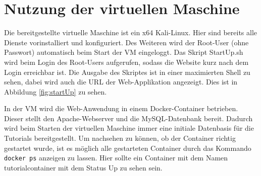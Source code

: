 \section{Nutzung der virtuellen Maschine}

Die bereitgestellte virtuelle Maschine ist ein x64 Kali-Linux. Hier sind bereits alle Dienste vorinstalliert und konfiguriert. Des Weiteren wird der Root-User (ohne Passwort) automatisch beim Start der VM eingeloggt. Das Skript StartUp.sh wird beim Login des Root-Users aufgerufen, sodass die Website kurz nach dem Login erreichbar ist. Die Ausgabe des Skriptes ist in einer maximierten Shell zu sehen, dabei wird auch die URL der Web-Applikation angezeigt. Dies ist in Abbildung \ref{fig:startUp} zu sehen.\medskip

In der VM wird die Web-Anwendung in einem Docker-Container betrieben. Dieser stellt den Apache-Webserver und die MySQL-Datenbank bereit. Dadurch wird beim Starten der virtuellen Maschine immer eine initiale Datenbasis für die Tutorials bereitgestellt. Um nachsehen zu können, ob der Container richtig gestartet wurde, ist es möglich alle gestarteten Container durch das Kommando \colorbox{altgray}{\lstinline|docker ps|} anzeigen zu lassen. Hier sollte ein Container mit dem Namen tutorialcontainer mit dem Status Up zu sehen sein. 
